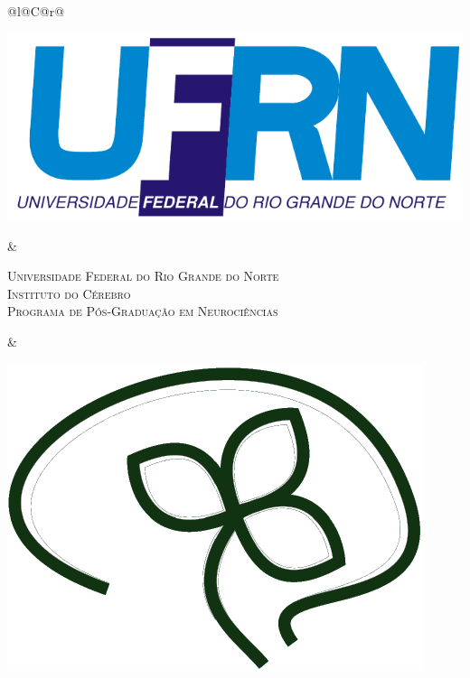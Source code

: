 %
%

\begin{titlepage}

\begin{center}

\small

\begin{tabularx}{\linewidth}{@{}l@{}C@{}r@{}}
	\parbox[c]{3cm}{
		\includegraphics[width=\linewidth]{tex/00-estrutural/figuras/UFRN}
	} &
	
	\begin{center}
		\textsf{\textsc{
			Universidade Federal do Rio Grande do Norte\\
			Instituto do Cérebro\\
			Programa de Pós-Graduação em Neurociências
		}}
	\end{center} &
	
	\parbox[c]{3cm}{
		\includegraphics[width=\linewidth]{tex/00-estrutural/figuras/Ice}}
\end{tabularx}


\end{center}
\end{titlepage}
